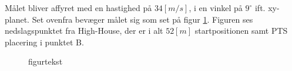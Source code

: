 Målet bliver affyret med en hastighed på $34 [m/s]$, i en vinkel på $9^{\circ}$ ift. xy-
planet. Set ovenfra bevæger målet sig som set på figur \ref{fig:para_in_xy_plane}. 
Figuren ses nedslagspunktet fra High-House, der er i alt $52 [m]$ startpositionen samt 
PTS placering i punktet B. 



\begin{figure}[!th]
\centering
\begin{tikzpicture}[scale=1]

\end{tikzpicture}
\caption[tekst i indholdsfortegnelsen]{figurtekst}
\label{fig:para_in_xy_plane}
\end{figure}

